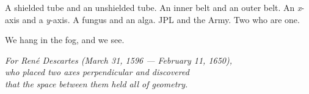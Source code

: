 \documentclass[12pt, letterpaper]{article}
\begin{document}
A shielded tube and an unshielded tube. An inner belt and an outer belt. An \textit{x}-axis and a \textit{y}-axis. A fungus and an alga. JPL and the Army. Two who are one.

We hang in the fog, and we see.

\vspace{2em}
\begin{center}
\textit{For Ren\'e Descartes (March 31, 1596 --- February 11, 1650),\\who placed two axes perpendicular and discovered\\that the space between them held all of geometry.}
\end{center}
\end{document}
